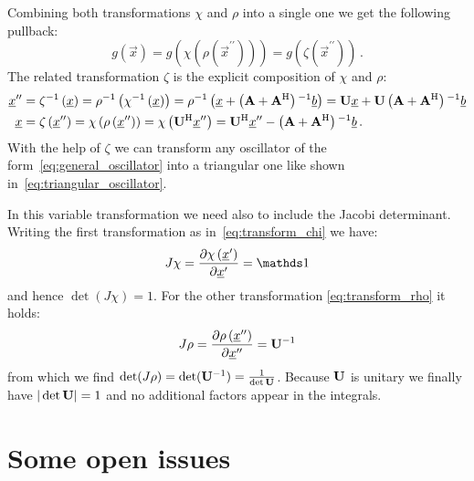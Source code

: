 \documentclass[a4paper,10pt]{article}
\begin{document}
Combining both transformations $\chi$ and $\rho$ into a single one
we get the following pullback:
\begin{equation}
  g\left(\vec{x}\right)
  = g\left(\chi\left(\rho\left(\vec{x}^{\prime\prime}\right)\right)\right)
  = g\left(\zeta\left(\vec{x}^{\prime\prime}\right)\right) \,.
\end{equation}
The related transformation $\zeta$ is the explicit
composition of $\chi$ and $\rho$:
\begin{equation*}
\begin{split}
  \underline{x}^{\prime\prime} & = \zeta{}^{-1} \left(\underline{x}\right)
                  = \rho{}^{-1} \left( \chi{}^{-1} \left(\underline{x}\right) \right)
                  = \rho{}^{-1} \left(\underline{x} + \left(\mathbf{A} + \mathbf{A}{}^{\textnormal{H}}\right){}^{-1} \underline{b}\right)
                  = \mathbf{U} \underline{x} + \mathbf{U} \left(\mathbf{A} + \mathbf{A}{}^{\textnormal{H}}\right){}^{-1} \underline{b} \\
  \underline{x} & = \zeta \left(\underline{x}^{\prime\prime}\right)
            = \chi \left( \rho \left(\underline{x}^{\prime\prime}\right) \right)
            = \chi \left( \mathbf{U}{}^{\textnormal{H}} \underline{x}^{\prime\prime} \right)
            = \mathbf{U}{}^{\textnormal{H}} \underline{x}^{\prime\prime} - \left(\mathbf{A} + \mathbf{A}{}^{\textnormal{H}}\right){}^{-1} \underline{b} \,.
\end{split}
\end{equation*}
With the help of $\zeta$ we can transform any oscillator of
the form~\eqref{eq:general_oscillator} into a triangular
one like shown in~\eqref{eq:triangular_oscillator}.

In this variable transformation we need also to include
the Jacobi determinant.
Writing the first transformation as in~\eqref{eq:transform_chi} we have:
\begin{equation}
  J\chi = \pdiff{\chi\left( \vec{x}^{\prime} \right)}{\vec{x}^{\prime}} = \id
\end{equation}
and hence $\det(J\chi) = 1$. For the other transformation
\eqref{eq:transform_rho} it holds:
\begin{equation}
 J\rho = \frac{\partial \rho\left(\underline{x}^{\prime\prime}\right)}{\partial \underline{x}^{\prime\prime}} = \mathbf{U}{}^{-1}
\end{equation}
from which we find $\det(J\rho) = \det(\mathbf{U}{}^{-1}) = \frac{1}{\det\mathbf{U}}$.
Because $\mathbf{U}$ is unitary we finally have $|\det\mathbf{U}| = 1$ and no
additional factors appear in the integrals.


\section{Some open issues}
\end{document}

